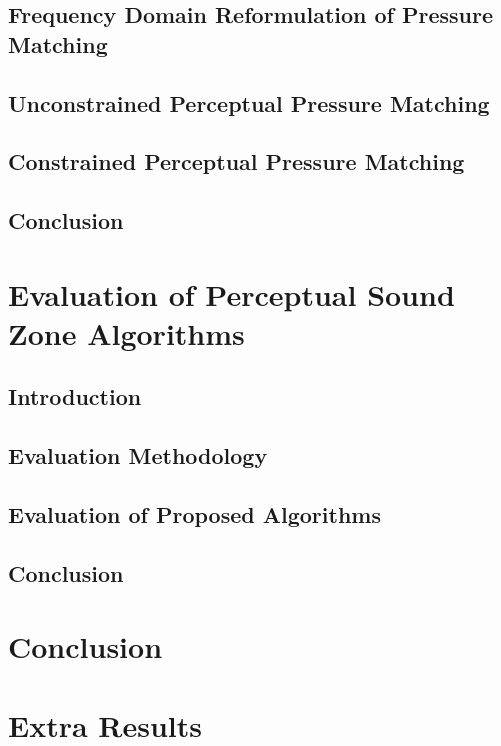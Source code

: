 \documentclass[10pt,twoside,openright,titlepage]{ce}
\begin{document}
\section{Frequency Domain Reformulation of Pressure Matching}
\label{ch:perceptual_sound_zone:frequency_domain}

\newpage
\section{Unconstrained Perceptual Pressure Matching}
\label{ch:perceptual_sound_zone:perceptual_minimization}

\newpage
\section{Constrained Perceptual Pressure Matching}
\label{ch:perceptual_sound_zone:perceptual_constraining}

\newpage
\section{Conclusion}
\label{ch:perceptual_sound_zone:conclusion}


\chapter{Evaluation of Perceptual Sound Zone Algorithms}
\label{ch:results}
\section{Introduction}
\label{ch:results:introduction}

\newpage
\section{Evaluation Methodology}

\newpage
\section{Evaluation of Proposed Algorithms}

\newpage
\section{Conclusion}
\label{ch:results:conclusion}


\chapter{Conclusion}




\appendix
\chapter{Extra Results}

\newpage
\end{document}
